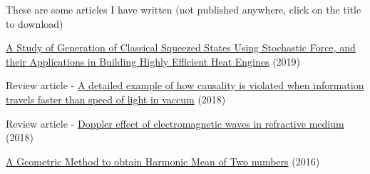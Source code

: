 

\begin{cventries}

  \cventry
    {These are some articles I have written (not published anywhere, click on the title to download)} %
    {} %
    {} %
    {} %
    {
      \begin{cvitems} %
      	\item{\href{https://github.com/apandada1/apandada1.github.io/raw/master/articles/nanoheatengines.pdf}{A Study of Generation of Classical Squeezed States Using Stochastic Force, and their Applications in Building Highly Efficient Heat Engines} (2019)}
        \item {Review article - \href{https://github.com/apandada1/apandada1.github.io/raw/master/articles/tachyon.pdf}{A detailed example of how causality is violated when information travels faster than speed of light in vaccum} (2018)}
        \item{Review article - \href{https://github.com/apandada1/apandada1.github.io/raw/master/articles/doppler_effect.pdf}{Doppler effect of electromagnetic waves in refractive medium} (2018)}
        \item{\href{https://github.com/apandada1/apandada1.github.io/raw/master/articles/Harmonic_Mean.pdf}{A Geometric Method to obtain Harmonic Mean of Two numbers} (2016)}
      \end{cvitems}
    }
\end{cventries}
